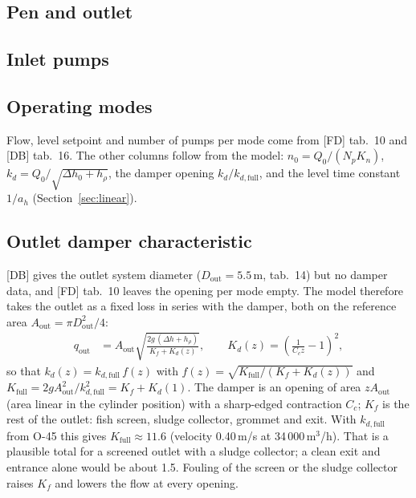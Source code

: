 \documentclass[11pt]{article}
\begin{document}
\subsection{Pen and outlet}


\subsection{Inlet pumps}


\subsection{Operating modes}
Flow, level setpoint and number of pumps per mode come from [FD] tab.~10 and [DB] tab.~16. The
other columns follow from the model: $n_0 = Q_0/(N_pK_n)$, $k_d = Q_0/\sqrt{\Delta h_0+h_\rho}$,
the damper opening $k_d/k_{d,\text{full}}$, and the level time constant $1/a_h$
(Section~\ref{sec:linear}).

\begin{center}

\end{center}

\subsection{Outlet damper characteristic}\label{sec:damper}
[DB] gives the outlet system diameter ($D_\text{out}=5.5$\,m, tab.~14) but no damper data, and
[FD] tab.~10 leaves the opening per mode empty. The model therefore takes the outlet as a fixed
loss in series with the damper, both on the reference area $A_\text{out}=\pi D_\text{out}^2/4$:
\begin{align}
  q_\text{out} &= A_\text{out}\sqrt{\frac{2g\,(\Delta h+h_\rho)}{K_f + K_d(z)}}, \qquad
  K_d(z) = \left(\frac{1}{C_c z}-1\right)^2,
\end{align}
so that $k_d(z) = k_{d,\text{full}}\,f(z)$ with $f(z)=\sqrt{K_\text{full}/(K_f+K_d(z))}$ and
$K_\text{full} = 2gA_\text{out}^2/k_{d,\text{full}}^2 = K_f + K_d(1)$. The damper is an opening of
area $zA_\text{out}$ (area linear in the cylinder position) with a sharp-edged contraction $C_c$;
$K_f$ is the rest of the outlet: fish screen, sludge collector, grommet and exit. With
$k_{d,\text{full}}$ from O-45 this gives $K_\text{full}\approx 11.6$ (velocity
0.40\,m/s at 34\,000\,m$^3$/h). That is a plausible total for a screened outlet with a sludge
collector; a clean exit and entrance alone would be about 1.5. Fouling of the screen or the
sludge collector raises $K_f$ and lowers the flow at every opening.
\end{document}
